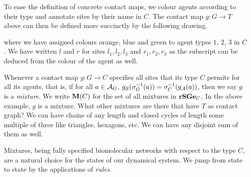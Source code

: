 To ease the definition of concrete contact maps,
we colour agents according to their type
and annotate sites by their name in $C$.
The contact map $g: G \to T$ above can then be defined
more succinctly by the following drawing.
\vspace{.3cm}
\begin{center}
\end{center}
where we have assigned colours orange, blue and green to
agent types $1$, $2$, $3$ in $C$.
We have written $l$ and $r$ for sites $l_1,l_2,l_3$ and $r_1,r_2,r_3$
as the subscript can be deduced from the colour of the agent as well.

Whenever a contact map $g: G \to C$ specifies all sites
that its type $C$ permits for all its agents, that is,
if for all $a \in \mathcal{A}_G$,
$g_{\mathcal{S}}(\sigma_G^{-1}(a)) = \sigma_C^{-1}(g_{\mathcal{A}}(a))$,
then we say $g$ is a \emph{mixture}.
We write $\mathbf{M}(C)$ for the set of all mixtures in $\mathbf{rSGe}_C$.
In the above example, $g$ is a mixture.
What other mixtures are there that have $T$ as contact graph?
We can have chains of any length and closed cycles
of length some multiple of three like triangles, hexagons, etc.
We can have any disjoint sum of them as well.

Mixtures, being fully specified biomolecular networks
with respect to the type $C$,
are a natural choice for the states of our dynamical system.
We jump from state to state by the applications of \emph{rules}.


